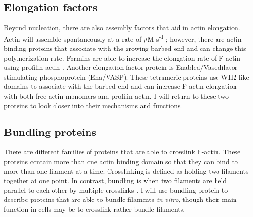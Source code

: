 \subsection{Elongation factors}\label{elongators}
Beyond nucleation, there are also assembly factors that aid in actin elongation. Actin will assemble spontaneously at a rate of  $\mu$M s\textsuperscript{-1} \citep{pollard_rate_1986}; however, there are actin binding proteins that associate with the growing barbed end and can change this polymerization rate. Formins are able to increase the elongation rate of F-actin using profilin-actin \citep{pollard_actin_2016}. Another elongation factor protein is Enabled/Vasodilator stimulating phosphoprotein (Ena/VASP). These tetrameric proteins use WH2-like domains to associate with the barbed end and can increase F-actin elongation with both free actin monomers and profilin-actin. I will return to these two proteins to look closer into their mechanisms and functions.

\subsection{Bundling proteins}\label{bundlers}
There are different families of proteins that are able to crosslink F-actin. These proteins contain more than one actin binding domain so that they can bind to more than one filament at a time. Crosslinking is defined as holding two filaments together at one point. In contrast, bundling is when two filaments are held parallel to each other by multiple crosslinks \citep{pollard_actin_2016}. I will use bundling protein to describe proteins that are able to bundle filaments \textit{in vitro}, though their main function in cells may be to crosslink rather bundle filaments. 

